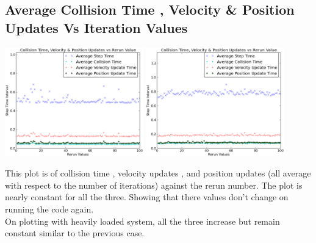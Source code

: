 \documentclass[11pt, a4paper]{article}
\begin{document}
\subsection{Average Collision Time , Velocity \& Position Updates Vs Iteration Values}

\begin{center}
\includegraphics[width = 6cm]{plots-normal/l4.eps}
\includegraphics[width = 6cm]{plots-high/h4.eps}
\end{center}

This plot is of collision time , velocity updates , and position updates (all average with respect to the number of iterations) against the rerun number. The plot is nearly constant for all the three. Showing that there values don't change on running the code again. \\
On plotting with heavily loaded system, all the three increase but remain constant similar to the previous case.
\end{document}
